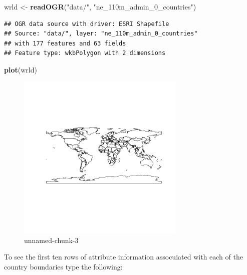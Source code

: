 \documentclass[]{article}
\newenvironment{Shaded}{}{}
\newcommand{\KeywordTok}[1]{\textcolor[rgb]{0.00,0.44,0.13}{\textbf{{#1}}}}
\newcommand{\StringTok}[1]{\textcolor[rgb]{0.25,0.44,0.63}{{#1}}}
\newcommand{\NormalTok}[1]{{#1}}
\let\Oldincludegraphics\includegraphics
\renewcommand{\includegraphics}[1]{\Oldincludegraphics[width=8cm]{#1}}
\begin{document}
\begin{Shaded}
\begin{Highlighting}[]
\NormalTok{wrld <- }\KeywordTok{readOGR}\NormalTok{(}\StringTok{"data/"}\NormalTok{, }\StringTok{"ne_110m_admin_0_countries"}\NormalTok{)}
\end{Highlighting}
\end{Shaded}
\begin{verbatim}
## OGR data source with driver: ESRI Shapefile 
## Source: "data/", layer: "ne_110m_admin_0_countries"
## with 177 features and 63 fields
## Feature type: wkbPolygon with 2 dimensions
\end{verbatim}
\begin{Shaded}
\begin{Highlighting}[]
\KeywordTok{plot}\NormalTok{(wrld)}
\end{Highlighting}
\end{Shaded}
\begin{figure}[htbp]
\centering
\includegraphics{figure/unnamed-chunk-3.png}
\caption{unnamed-chunk-3}
\end{figure}

To see the first ten rows of attribute information assocuiated with each
of the country boundaries type the following:
\end{document}
